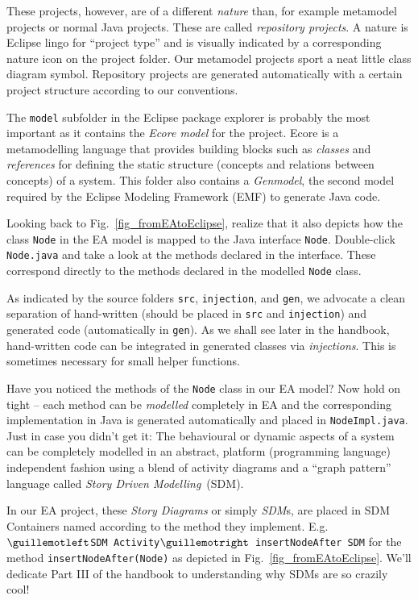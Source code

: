 These projects, however, are of a different \emph{nature} than, for example metamodel projects or normal Java projects. These are called \emph{repository
projects}. A nature is Eclipse lingo for ``project type'' and is visually indicated by a corresponding nature icon on the project folder.
Our metamodel projects sport a neat little class diagram symbol. Repository projects are generated automatically with a certain project structure according to
our conventions.

The \texttt{model} subfolder in the Eclipse package explorer is probably the most important as it contains the \emph{Ecore model} for the project. Ecore is a
metamodelling language that provides building blocks such as \emph{classes} and \emph{references} for defining the  static structure (concepts and relations
between concepts) of a system. This folder also contains a \emph{Genmodel}, the second model required by the Eclipse Modeling Framework (EMF) to generate Java
code.

Looking back to Fig.~\ref{fig_fromEAtoEclipse}, realize that it also depicts how the class \texttt{Node} in the EA model is mapped to the Java interface
\texttt{Node}. Double-click \texttt{Node.java} and take a look at the methods declared in the interface. These correspond directly to the methods declared in
the modelled \texttt{Node} class.

As indicated by the source folders \texttt{src}, \texttt{injection}, and \texttt{gen}, we advocate a clean separation of hand-written (should be placed in
\texttt{src} and \texttt{injection}) and generated code (automatically in \texttt{gen}). As we shall see later in the handbook, hand-written code can be
integrated in generated classes via \emph{injections}. This is sometimes necessary for small helper functions.

Have you noticed the methods of the \texttt{Node} class in our EA model?  Now hold on tight -- each method can be \emph{modelled} completely in EA and the
corresponding implementation in Java is generated automatically and placed in \texttt{NodeImpl.java}.
Just in case you didn't get it: The behavioural or dynamic aspects of a system can be completely modelled in an abstract, platform (programming language)
independent fashion using a blend of activity  diagrams and a ``graph pattern'' language called \textit{Story Driven Modelling}~(SDM).


In our EA project, these \emph{Story Diagrams} or simply \emph{SDM}s, are placed in SDM Containers named according to the method they implement.
E.g.  \texttt{$\guillemotleft$SDM Activity$\guillemotright$ insertNodeAfter SDM} for the method \texttt{insertNodeAft\-er(Node)} as depicted in
Fig.~\ref{fig_fromEAtoEclipse}.  We'll dedicate Part III of the handbook to understanding why SDMs are so  {\huge crazily} cool!

